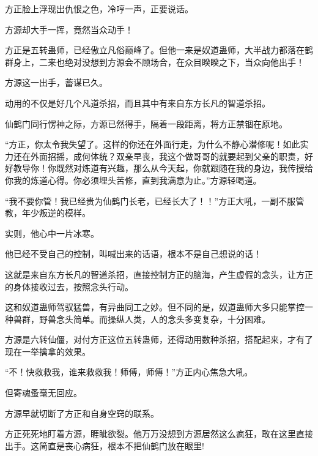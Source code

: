 \begin{this_body}
方正脸上浮现出仇恨之色，冷哼一声，正要说话。

方源却大手一挥，竟然当众动手！

方正是五转蛊师，已经傲立凡俗巅峰了。但他一来是奴道蛊师，大半战力都落在鹤群身上，二来也绝对没想到方源会不顾场合，在众目睽睽之下，当众向他出手！

方源这一出手，蓄谋已久。

动用的不仅是好几个凡道杀招，而且其中有来自东方长凡的智道杀招。

仙鹤门同行愣神之际，方源已然得手，隔着一段距离，将方正禁锢在原地。

“方正，你太令我失望了。这样的你还在外面行走，为什么不静心潜修呢！如此实力还在外面招摇，成何体统？双亲早丧，我这个做哥哥的就要起到父亲的职责，好好教导你！你既然对炼道有兴趣，那么从今天起，你就跟随在我的身边，我传授给你我的炼道心得。你必须埋头苦修，直到我满意为止。”方源轻喝道。

“我不要你管！我已经贵为仙鹤门长老，已经长大了！！”方正大吼，一副不服管教，年少叛逆的模样。

实则，他心中一片冰寒。

他已经不受自己的控制，叫喊出来的话语，根本不是自己想说的话！

这就是来自东方长凡的智道杀招，直接控制方正的脑海，产生虚假的念头，让方正的身体接收过去，按照念头行动。

这和奴道蛊师驾驭猛兽，有异曲同工之妙。但不同的是，奴道蛊师大多只能掌控一种兽群，野兽念头简单。而操纵人类，人的念头多变复杂，十分困难。

方源是六转仙僵，对付方正这位五转蛊师，还得动用数种杀招，搭配起来，才有了现在一举擒拿的效果。

“不！快救救我，谁来救救我！师傅，师傅！”方正内心焦急大吼。

但寄魂蚤毫无回应。

方源早就切断了方正和自身空窍的联系。

方正死死地盯着方源，睚眦欲裂。他万万没想到方源居然这么疯狂，敢在这里直接出手。这简直是丧心病狂，根本不把仙鹤门放在眼里!

\end{this_body}

